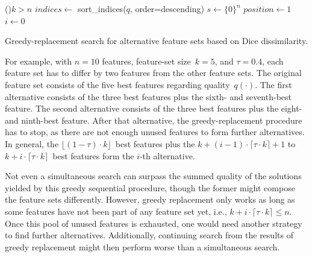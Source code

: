 \documentclass{article}
\theoremstyle{definition}
\begin{document}
\begin{algorithm}[htb]
	\DontPrintSemicolon
	\BlankLine
	\If(){$k > n$}{
		\Return{$\emptyset$}
	}
	$indices \leftarrow$ sort\_indices($q$, order=descending) 
	$s \leftarrow \{0\}^n$ 
	$position \leftarrow 1$ 
	$i \leftarrow 0$\ 
	\caption{Greedy-replacement search for alternative feature sets based on Dice dissimilarity.}
	\label{al:greedy-replacement}
\end{algorithm}

For example, with $n=10$ features, feature-set size~$k=5$, and $\tau=0.4$, each feature set has to differ by two features from the other feature sets.
The original feature set consists of the five best features regarding quality~$q(\cdot)$.
The first alternative consists of the three best features plus the sixth- and seventh-best feature.
The second alternative consists of the three best features plus the eight- and ninth-best feature.
After that alternative, the greedy-replacement procedure has to stop, as there are not enough unused features to form further alternatives.
In general, the $\lfloor (1 - \tau) \cdot k \rfloor$~best features plus the $k + (i-1) \cdot \lceil \tau \cdot k \rceil + 1$ to $k + i \cdot \lceil \tau \cdot k \rceil$~best features form the $i$-th alternative.

Not even a simultaneous search can surpass the summed quality of the solutions yielded by this greedy sequential procedure, though the former might compose the feature sets differently.
However, greedy replacement only works as long as some features have not been part of any feature set yet, i.e., $k + i \cdot \lceil \tau \cdot k \rceil \leq n$.
Once this pool of unused features is exhausted, one would need another strategy to find further alternatives.
Additionally, continuing search from the results of greedy replacement might then perform worse than a simultaneous search.
\end{document}
